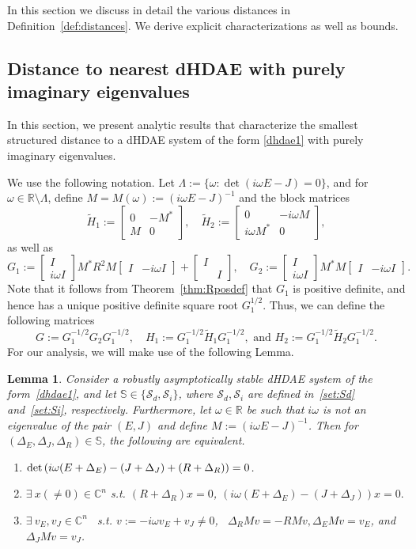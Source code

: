 \documentclass[11pt]{article}
\newcommand {\mat}[1]{\left[\begin{array}{#1}}
\newcommand {\rix}{\end{array}\right]}
\newtheorem{lemma}[theorem]{Lemma}
\newcommand{\R}{\mathbb R}
\newcommand{\C}{\mathbb C}
\begin{document}
In this section we discuss in detail the various  distances in Definition~\ref{def:distances}. We derive explicit characterizations as well as bounds.

\subsection{Distance to nearest dHDAE with purely imaginary eigenvalues}\label{sec:distim}
In this section, we present analytic results that characterize the smallest structured distance to a dHDAE system of the form \eqref{dhdae1} with purely imaginary eigenvalues.

We use the following notation. Let $\Lambda:=\{\omega:\det(i\omega E-J) =0\}$, and for $\omega\in \R\setminus \Lambda$, define $M=M(\omega):=(i\omega E-J)^{-1}$ and the  block matrices
%
\begin{equation}\label{mat:tildeH}
    \tilde H_1:=\mat{cc} 0 & -M^*\\ M & 0 \rix, \quad \tilde H_2:=\mat{cc} 0 & -i\omega M \\ i\omega M^* & 0 \rix,
\end{equation}
%
as well as
%
\begin{equation}\label{mat:G1G2}
    G_1:=\mat{c} I\\i\omega I \rix M^*R^2M \mat{cc} I & -i\omega I \rix + \mat{cc}I & \\ & I \rix, \quad G_2:=\mat{c} I\\i\omega I \rix M^*M \mat{cc}I & -i\omega I \rix.
\end{equation}
%
Note that  it follows from Theorem~\ref{thm:Rposdef} that $G_1$ is positive definite, and hence has a unique positive definite square root $G_1^{1/2}$. Thus, we can define the following matrices
%
\begin{equation}\label{mat:GH1H2}
    G:=G_1^{-1/2}G_2G_1^{-1/2}, \quad H_1:=G_1^{-1/2}\tilde H_1G_1^{-1/2}, \text{ and } H_2:= G_1^{-1/2}\tilde H_2G_1^{-1/2}.
\end{equation}
%
For our analysis, we will make use of the following Lemma.
%
\begin{lemma}\label{lem:tfae-map}
    Consider a robustly asymptotically stable dHDAE system of the form~\eqref{dhdae1}, and let $\mathbb S\in \{\mathcal S_d,\mathcal S_i\}$, where $\mathcal S_d,\mathcal S_i$ are defined in~\eqref{set:Sd} and~\eqref{set:Si}, respectively. Furthermore, let $\omega\in \R$ be such that $i\omega$ is not an eigenvalue of the pair $(E,J)$ and define $M:=(i\omega E-J)^{-1}$. Then for $(\Delta_E,\Delta_J,\Delta_R)\in\mathbb S$, the following are equivalent.
    \begin{enumerate}
     \item[\rm (1)] ${\rm det}\left(i\omega (E+\Delta_E)-(J+\Delta_J)+(R+\Delta_R)\right)=0$.
        \item[\rm (2)] $\exists~x(\neq 0)\in \C^{n}$ s.t. $(R+\Delta_R)x=0$, $(i\omega (E+\Delta_E)-(J+\Delta_J))x=0.$
        \item[\rm (3)] $\exists~v_E,v_J\in \C^{n}$~ s.t. $v:=-i\omega v_E+v_J\neq 0$, ~$\Delta_R M v = -RM v, \Delta_EM v=v_E$, and $\Delta_JM v=v_J$.
    \end{enumerate}
\end{lemma}
\end{document}

